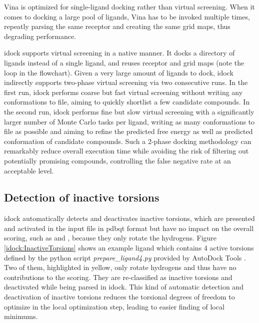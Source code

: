Vina is optimized for single-ligand docking rather than virtual screening. When it comes to docking a large pool of ligands, Vina has to be invoked multiple times, repeatly parsing the same receptor and creating the same grid maps, thus degrading performance.

idock supports virtual screening in a native manner. It docks a directory of ligands instead of a single ligand, and reuses receptor and grid maps (note the loop in the flowchart). Given a very large amount of ligands to dock, idock indirectly supports two-phase virtual screening via two consecutive runs. In the first run, idock performs coarse but fast virtual screening without writing any conformations to file, aiming to quickly shortlist a few candidate compounds. In the second run, idock performs fine but slow virtual screening with a significantly larger number of Monte Carlo tasks per ligand, writing as many conformations to file as possible and aiming to refine the predicted free energy as well as predicted conformation of candidate compounds. Such a 2-phase docking methodology can remarkably reduce overall execution time while avoiding the risk of filtering out potentially promising compounds, controlling the false negative rate at an acceptable level.

\subsection{Detection of inactive torsions}

idock automatically detects and deactivates inactive torsions, which are presented and activated in the input file in pdbqt format but have no impact on the overall scoring, such as  and , because they only rotate the hydrogens. Figure \ref{idock:InactiveTorsions} shows an example ligand which contains 4 active torsions defined by the python script \textit{prepare\_ligand4.py} provided by AutoDock Tools \cite{785,596}. Two of them, highlighted in yellow, only rotate hydrogens and thus have no contributions to the scoring. They are re-classified as inactive torsions and deactivated while being parsed in idock. This kind of automatic detection and deactivation of inactive torsions reduces the torsional degrees of freedom to optimize in the local optimization step, leading to easier finding of local minimums.

